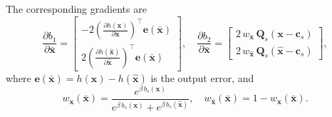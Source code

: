 \documentclass[letterpaper, 10 pt, conference]{ieeeconf}  %
\begin{document}
The corresponding gradients are
\[
    \frac{\partial b_1}{\partial \bar{\mathbf{x}}} =
    \begin{bmatrix}
    -2 \left(\frac{\partial h(\mathbf{x})}{\partial \mathbf{x}}\right)^\top \mathbf{e}(\bar{\mathbf{x}}) \\
    2 \left(\frac{\partial h(\hat{\mathbf{x}})}{\partial \hat{\mathbf{x}}}\right)^\top \mathbf{e}(\bar{\mathbf{x}})
    \end{bmatrix},
    \quad
    \frac{\partial b_2}{\partial \bar{\mathbf{x}}}
    =
    \begin{bmatrix}
    2 \,w_{\mathbf{x}} \, \mathbf{Q}_s (\mathbf{x} - \mathbf{c}_s) \\
    2 \, w_{\hat{\mathbf{x}}} \, \mathbf{Q}_s (\hat{\mathbf{x}} - \mathbf{c}_s)
    \end{bmatrix},
\]
where $\mathbf{e}(\bar{\mathbf{x}}) = h(\mathbf{x}) - h(\hat{\mathbf{x}})$ is the output error, and
\[
    w_{\mathbf{x}}(\bar{\mathbf{x}}) = \frac{e^{\beta \, b_s(\mathbf{x})}}{e^{\beta \, b_s(\mathbf{x})} + e^{\beta \, b_s(\hat{\mathbf{x}})}}, \quad
    w_{\hat{\mathbf{x}}}(\bar{\mathbf{x}}) = 1 - w_{\mathbf{x}}(\bar{\mathbf{x}}).
\]
\end{document}
